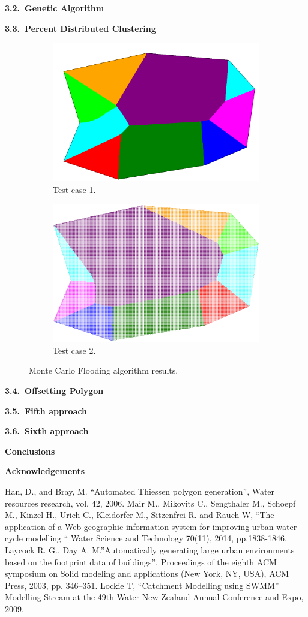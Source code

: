 \documentclass[11pt,leqno]{book}
\def\bibname{{\Large\bf References}}
\newcommand{\sect}[1]{\vskip7mm\par{\large \bf #1}}
\newcommand{\subsect}[1]{\vskip 3mm\par{\bf#1}}
\begin{document}
\subsect{3.2.~Genetic Algorithm}

\subsect{3.3.~Percent Distributed Clustering}

\begin{figure}
\centering
\begin{subfigure}{.5\textwidth}
  \centering
  \includegraphics[width=.5\linewidth]{pic10.png}
  \caption{Test case 1.}
  \label{fig:sub1}
\end{subfigure}%
\begin{subfigure}{.5\textwidth}
  \centering
  \includegraphics[width=.5\linewidth]{pic11.png}
  \caption{Test case 2.}
  \label{fig:sub2}
\end{subfigure}
\caption{Monte Carlo Flooding algorithm results.}
\label{fig:six}
\end{figure}

\subsect{3.4.~Offsetting Polygon}

\subsect{3.5.~Fifth approach}

\subsect{3.6.~Sixth approach}

\sect{Conclusions}

\sect{Acknowledgements}

\def\bibname{{\Large\bf References}}
\begin{thebibliography}{99}
%
 Han, D., and Bray, M. “Automated Thiessen polygon generation”, Water resources research, vol. 42, 2006.
%
 Mair M., Mikovits C., Sengthaler M., Schoepf M., Kinzel H., Urich C., Kleidorfer M., Sitzenfrei R. and Rauch W, “The application of a Web-geographic information system for improving urban water cycle modelling “  Water Science and Technology 70(11), 2014, pp.1838-1846.
%
 Laycock R. G., Day A. M.”Automatically generating large urban environments based on the footprint data of buildings”, Proceedings of the eighth ACM symposium on Solid modeling and applications (New York, NY, USA), ACM Press, 2003, pp. 346–351.
%
 Lockie T, “Catchment Modelling using SWMM” Modelling Stream at the 49th Water New Zealand Annual Conference and Expo, 2009.
%
\end{thebibliography}
%
\end{document}
